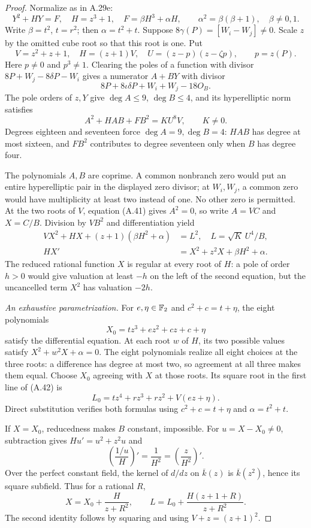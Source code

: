 \begin{proof}
Normalize as in A.29e:
\[
 Y^2+HY=F,\quad H=z^3+1,\quad F=\beta H^3+\alpha H,\qquad
 \alpha^2=\beta(\beta+1),\quad\beta\ne0,1.
\]
Write $\beta=t^2$, $t=r^2$; then $\alpha=t^2+t$.
Suppose $8\gamma(P)=[W_i-W_j]\ne0$. Scale $z$ by the omitted
cube root so that this root is one. Put
\[
 V=z^2+z+1,\quad H=(z+1)V,\quad
 U=(z-p)(z-\zeta p),\qquad p=z(P).
\]
Here $p\ne0$ and $p^3\ne1$. Clearing the poles of a function
with divisor $8P+W_j-8\delta P-W_i$ gives a numerator $A+BY$
with divisor
\[
 8P+8\iota\delta P+W_i+W_j-18O_B.
\]
The pole orders of $z,Y$ give $\deg A\le9$, $\deg B\le4$,
and its hyperelliptic norm satisfies
\[
 A^2+HAB+FB^2=KU^8V,\qquad K\ne0.                       \tag{A.41}
\]
Degrees eighteen and seventeen force $\deg A=9,\deg B=4$:
$HAB$ has degree at most sixteen, and $FB^2$ contributes
to degree seventeen only when $B$ has degree four.

The polynomials $A,B$ are coprime. A common nonbranch zero
would put an entire hyperelliptic pair in the displayed
zero divisor; at $W_i,W_j$, a common zero would have
multiplicity at least two instead of one. No other zero
is permitted. At the two roots of $V$, equation (A.41)
gives $A^2=0$, so write $A=VC$ and $X=C/B$. Division by
$VB^2$ and differentiation yield
\[
\begin{aligned}
 VX^2+HX+(z+1)(\beta H^2+\alpha)&=L^2,
                         \quad L=\sqrt K\,U^4/B,\\
 HX'&=X^2+z^2X+\beta H^2+\alpha.
\end{aligned}                                           \tag{A.42}
\]
The reduced rational function $X$ is regular at every
root of $H$: a pole of order $h>0$ would give valuation
at least $-h$ on the left of the second equation,
but the uncancelled term $X^2$ has valuation $-2h$.

\emph{An exhaustive parametrization.}
For $e,\eta\in\mathbb F_2$ and $c^2+c=t+\eta$, the eight polynomials
\[
 X_0=tz^3+ez^2+cz+c+\eta
\]
satisfy the differential equation. At each root $w$ of
$H$, its two possible values satisfy $X^2+w^2X+\alpha=0$.
The eight polynomials realize all eight choices at the
three roots: a difference has degree at most two, so
agreement at all three makes them equal. Choose $X_0$
agreeing with $X$ at those roots. Its square root in
the first line of (A.42) is
\[
 L_0=tz^4+rz^3+rz^2+V(ez+\eta).
\]
Direct substitution verifies both formulas using
$c^2+c=t+\eta$ and $\alpha=t^2+t$.

If $X=X_0$, reducedness makes $B$ constant, impossible.
For $u=X-X_0\ne0$, subtraction gives $Hu'=u^2+z^2u$ and
\[
 \left(\frac{1/u}{H}\right)'=\frac1{H^2}
                         =\left(\frac z{H^2}\right)'.
\]
Over the perfect constant field, the kernel of $d/dz$ on
$\overline{k}(z)$ is $\overline{k}(z^2)$, hence its square
subfield. Thus for a rational $R$,
\[
 X=X_0+\frac{H}{z+R^2},\qquad
 L=L_0+\frac{H(z+1+R)}{z+R^2}.                          \tag{A.43}
\]
The second identity follows by squaring and using
$V+z=(z+1)^2$.


\end{proof}
